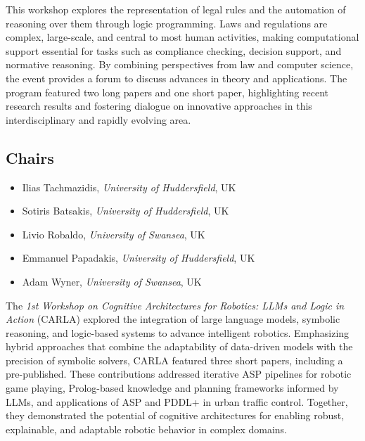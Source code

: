\documentclass[
]{ceurart}
\begin{document}


\noindent
This workshop explores the representation of legal rules and the automation of reasoning over them through logic programming. Laws and regulations are complex, large-scale, and central to most human activities, making computational support essential for tasks such as compliance checking, decision support, and normative reasoning. By combining perspectives from law and computer science, the event provides a forum to discuss advances in theory and applications. The program featured two long papers and one short paper, highlighting recent research results and fostering dialogue on innovative approaches in this interdisciplinary and rapidly evolving area.

\subsection*{Chairs}
\begin{itemize}
\item Ilias Tachmazidis, \emph{University of Huddersfield}, UK

\item Sotiris Batsakis, \emph{University of Huddersfield}, UK

\item Livio Robaldo, \emph{University of Swansea}, UK

\item Emmanuel Papadakis, \emph{University of Huddersfield}, UK

\item Adam Wyner, \emph{University of Swansea}, UK
\end{itemize}


\noindent
The \emph{1st Workshop on Cognitive Architectures for Robotics: LLMs and Logic in Action} (CARLA) explored the integration of large language models, symbolic reasoning, and logic-based systems to advance intelligent robotics. Emphasizing hybrid approaches that combine the adaptability of data-driven models with the precision of symbolic solvers, CARLA featured three short papers, including a pre-published. These contributions addressed iterative ASP pipelines for robotic game playing, Prolog-based knowledge and planning frameworks informed by LLMs, and applications of ASP and PDDL+ in urban traffic control. Together, they demonstrated the potential of cognitive architectures for enabling robust, explainable, and adaptable robotic behavior in complex domains.
\end{document}

